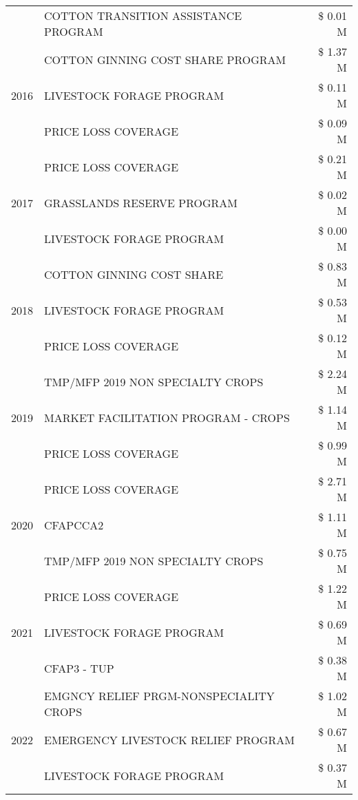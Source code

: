 \begin{tabular}{llr}
 & COTTON TRANSITION ASSISTANCE PROGRAM & \$ 0.01 M \\
\cline{1-3}
\multirow[t]{3}{*}{2016} & COTTON GINNING COST SHARE PROGRAM & \$ 1.37 M \\
 & LIVESTOCK FORAGE PROGRAM & \$ 0.11 M \\
 & PRICE LOSS COVERAGE & \$ 0.09 M \\
\cline{1-3}
\multirow[t]{3}{*}{2017} & PRICE LOSS COVERAGE & \$ 0.21 M \\
 & GRASSLANDS RESERVE PROGRAM & \$ 0.02 M \\
 & LIVESTOCK FORAGE PROGRAM & \$ 0.00 M \\
\cline{1-3}
\multirow[t]{3}{*}{2018} & COTTON GINNING COST SHARE & \$ 0.83 M \\
 & LIVESTOCK FORAGE PROGRAM & \$ 0.53 M \\
 & PRICE LOSS COVERAGE & \$ 0.12 M \\
\cline{1-3}
\multirow[t]{3}{*}{2019} & TMP/MFP 2019 NON SPECIALTY CROPS & \$ 2.24 M \\
 & MARKET FACILITATION PROGRAM - CROPS & \$ 1.14 M \\
 & PRICE LOSS COVERAGE & \$ 0.99 M \\
\cline{1-3}
\multirow[t]{3}{*}{2020} & PRICE LOSS COVERAGE & \$ 2.71 M \\
 & CFAPCCA2 & \$ 1.11 M \\
 & TMP/MFP 2019 NON SPECIALTY CROPS & \$ 0.75 M \\
\cline{1-3}
\multirow[t]{3}{*}{2021} & PRICE LOSS COVERAGE & \$ 1.22 M \\
 & LIVESTOCK FORAGE PROGRAM & \$ 0.69 M \\
 & CFAP3 - TUP & \$ 0.38 M \\
\cline{1-3}
\multirow[t]{3}{*}{2022} & EMGNCY RELIEF PRGM-NONSPECIALITY CROPS & \$ 1.02 M \\
 & EMERGENCY LIVESTOCK RELIEF PROGRAM & \$ 0.67 M \\
 & LIVESTOCK FORAGE PROGRAM & \$ 0.37 M \\
\cline{1-3}
\bottomrule
\end{tabular}
